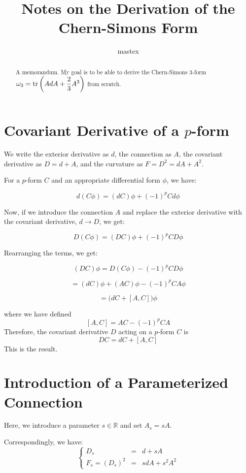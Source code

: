 \documentclass[uplatex]{jsarticle}
\title{
\textbf{Notes on the Derivation of the Chern-Simons Form}
}
\author{
mastex
}
\begin{document}
\maketitle

\begin{abstract}
	A memorandum. My goal is to be able to derive the Chern-Simons 3-form
	$\omega_{3} = {\rm tr} \left( {AdA + \dfrac{2}{3}A^{3}} \right) $
	from scratch.
\end{abstract}

\section{\textbf{Covariant Derivative of a $p$-form}}


We write the exterior derivative as $d$, the connection as $A$,
the covariant derivative as $D=d+A$,
and the curvature as $F=D^{2} = dA+A^{2}$.

For a $p$-form $C$ and an appropriate differential form $\phi$, we have:

$$
	d(C\phi)
	=(dC)\phi + (-1)^{p}Cd\phi
$$

Now, if we introduce the connection $A$ and replace the exterior derivative with the covariant derivative, $d \to D$, we get:

$$
	D(C\phi)
	=(DC)\phi + (-1)^{p}CD\phi
$$

Rearranging the terms, we get:

$$
	(DC)\phi
	= D(C\phi) - (-1)^{p}CD\phi
$$

$$
	= (dC) \phi + (AC) \phi - (-1)^{p}CA\phi
$$

$$
	= \big( dC + [A,C] \big) \phi
$$

where we have defined
$$
	[A,C]
	=
	AC - (-1)^{p}CA
$$
Therefore, the covariant derivative $D$ acting on a $p$-form $C$ is
$$
	DC = dC + [A,C]
$$
This is the result.


\section{\textbf{Introduction of a Parameterized Connection}}

Here, we introduce a parameter $s \in \mathbb{R}$ and set $A_{s} = sA$.

Correspondingly, we have:
$$
	\left\{
	\begin{array}{rcl}
		 D_{s} &=& d + sA\\
		 F_{s} = (D_{s})^{2} &=& sdA + s^{2} A^{2}
	\end{array}
	\right.
$$
\end{document}
